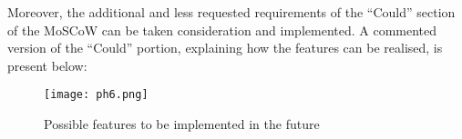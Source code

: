 Moreover, the additional and less requested requirements of the
``Could'' section of the MoSCoW can be taken consideration and
implemented. A commented version of the ``Could'' portion, explaining
how the features can be realised, is present below:

\begin{figure}[H]
      \centering
      \texttt{[image: ph6.png]}
      \caption{Possible features to be implemented in the future}
 \end{figure}
